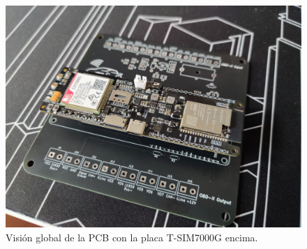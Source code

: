 \begin{figure}[H]
  \centering
  \includegraphics[width=\linewidth]{images/board-with-board.jpg}
  \caption{Visión global de la PCB con la placa T-SIM7000G encima.}
  \label{fig:board-with-board}
\end{figure}
